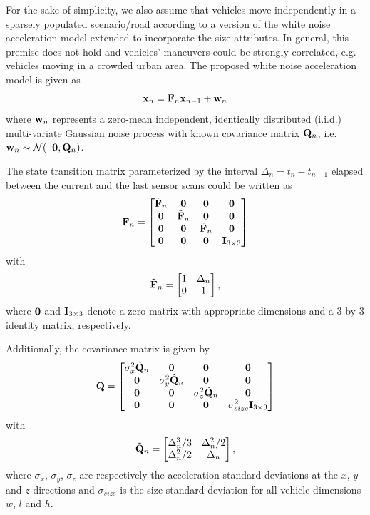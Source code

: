 \documentclass[letterpaper]{article}
\begin{document}
For the sake of simplicity, we also assume that vehicles move independently in a sparsely populated scenario/road according to a version of the white noise acceleration model \cite{Barsh1} extended to incorporate the size attributes. In general, this premise does not hold and vehicles' maneuvers could be strongly correlated, e.g. vehicles moving in a crowded urban area. The proposed white noise acceleration model is given as
\begin{equation}
{\bf x}_{n} = {\bf F}_{n}{\bf x}_{n-1} + {\bf w}_{n}
\end{equation}
\noindent where $ {\bf w}_{n} $ represents a zero-mean independent, identically distributed (i.i.d.) multi-variate Gaussian noise process with known covariance matrix $ {\bf Q}_{n} $, i.e. $ {\bf w}_{n} \sim {\cal N}(\cdot | {\bf 0}, {\bf Q}_{n}) $.

The state transition matrix parameterized by the interval $ \Delta_{n} = t_{n} - t_{n-1} $ elapsed between the current and the last sensor scans could be written as
\begin{equation} \label{eq:F matrix}
{\bf F}_{n}=\begin{bmatrix}
\tilde{\bf F}_{n} & {\bf 0} & {\bf 0} & {\bf 0} \\ 
{\bf 0} & \tilde{\bf F}_{n} & {\bf 0} & {\bf 0} \\
{\bf 0} & {\bf 0} & \tilde{\bf F}_{n} & {\bf 0} \\
{\bf 0} & {\bf 0} & {\bf 0} & {\bf I}_{3 \times 3} \\
\end{bmatrix}
\end{equation}
\noindent with
$$
\tilde{\bf F}_{n}=\begin{bmatrix}
1 & \Delta_{n} \\
0 & 1 
\end{bmatrix},
$$
\noindent where $ {\bf 0} $ and $ {\bf I}_{3 \times 3} $ denote a zero matrix with appropriate dimensions and a $ 3 $-by-$ 3 $ identity matrix, respectively.

Additionally, the covariance matrix is given by
\begin{equation} \label{eq:Q matrix}
{\bf Q}=\begin{bmatrix}
\sigma_{x}^{2} \tilde{\bf Q}_{n} & {\bf 0} & {\bf 0} & {\bf 0} \\
{\bf 0} & \sigma_{y}^{2} \tilde{\bf Q}_{n} & {\bf 0} & {\bf 0} \\
{\bf 0} & {\bf 0} & \sigma_{z}^{2} \tilde{\bf Q}_{n} & {\bf 0} \\
{\bf 0} & {\bf 0} & {\bf 0} & \sigma_{size}^{2} {\bf I}_{3 \times 3} \\
\end{bmatrix}
\end{equation}
\noindent with
$$
\tilde{\bf Q}_{n}=\begin{bmatrix}
\Delta_{n}^{3}/3 & \Delta_{n}^{2}/2 \\
\Delta_{n}^{2}/2 & \Delta_{n}
\end{bmatrix},
$$
\noindent where $ \sigma_{x} $, $ \sigma_{y} $, $ \sigma_{z} $ are respectively the acceleration standard deviations at the $ x $, $ y $ and $ z $ directions and $ \sigma_{size} $ is the size standard deviation for all vehicle dimensions $ w $, $ l $ and $ h $.
\end{document}
